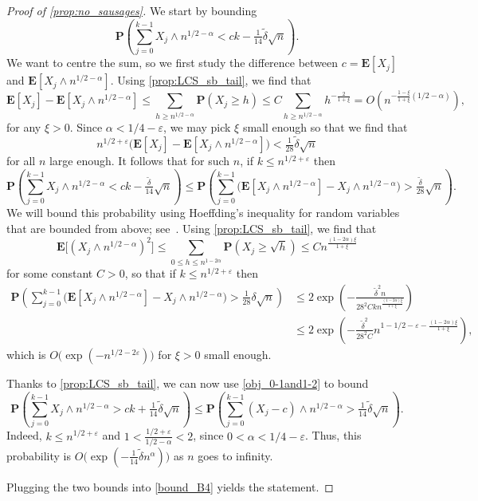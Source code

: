 \documentclass[11pt,reqno]{amsart}
\newcommand{\1}{\mathbf{1}}
\newcommand{\0}{\mathbf{0}}
\newcommand{\E}{{\mathbf E}}
\newcommand{\prob}{\mathbf{P}}
\newcommand{\eps}{\varepsilon}
\begin{document}
\begin{proof}[Proof of \cref{prop:no_sausages}]
    We start by bounding 
    \[\prob\left(\sum_{j=0}^{k-1} X_j \wedge n^{1/2-\alpha}<ck-\tfrac{1}{14}\tilde\delta \sqrt{n} \right). \]
    We want to centre the sum, so we first study the difference between $c=\E[X_j]$ and $\E[X_j\wedge n^{1/2-\alpha}]$. Using \cref{prop:LCS_sb_tail}, we find that 
    \[
    \E[X_j]-\E[X_j\wedge n^{1/2-\alpha}]\le \sum_{h\ge n^{1/2-\alpha}}\prob(X_j\ge h)\le C\sum_{h\ge n^{1/2-\alpha}} h^{-\frac{2}{1+\xi}}=O(n^{-\frac{1-\xi}{1+\xi}(1/2-\alpha)} ),
    \]
    for any $\xi>0$. Since $\alpha<1/4-\varepsilon$, we may pick $\xi$ small enough so that we find that \[n^{1/2+\varepsilon}\big(\E[X_j]-\E[X_j\wedge n^{1/2-\alpha}]\big)<\tfrac{1}{28}\tilde\delta \sqrt{n}\]
    for all $n$ large enough. It follows that for such $n$, if $k \le n^{1/2+\varepsilon}$ then 
    \[\prob\left(\sum_{j=0}^{k-1} X_j \wedge n^{1/2-\alpha}<ck-\tfrac{\tilde\delta}{14} \sqrt{n} \right)\le \prob\left(\sum_{j=0}^{k-1} \big( \E[X_j \wedge n^{1/2-\alpha} ]-X_j \wedge n^{1/2-\alpha}\big)>\tfrac{\tilde\delta}{28} \sqrt{n} \right) .\]
    We will bound this probability using Hoeffding's inequality for random variables that are bounded from above; see~\cite[Corollary 2.7]{FGL_hoeffding}. Using \cref{prop:LCS_sb_tail}, we find that 
    \[\E\big[(X_j \wedge n^{1/2-\alpha})^2\big]\le \sum_{0\le h\le n^{1-2\alpha}}\prob(X_j\ge \sqrt{h} )\le C n^{\tfrac{(1-2\alpha)\xi}{1+\xi}}\]
    for some constant $C>0$, so that if $k \le n^{1/2+\varepsilon}$ then
    \begin{align*}\prob\left(\sum_{j=0}^{k-1} \big( \E[X_j \wedge n^{1/2-\alpha} ]-X_j \wedge n^{1/2-\alpha}\big)>\tfrac{1}{28}\delta \sqrt{n} \right)&\le 2 \exp\left(-\frac{\tilde\delta^2 n }{28^2 C k n^{\tfrac{(1-2\alpha)\xi}{1+\xi}} }\right)\\&\leq 2\exp\left(-\frac{\tilde{\delta}^2}{28^2 C} n^{1-1/2-\varepsilon-\tfrac{(1-2\alpha)\xi}{1+\xi} }\right),\end{align*}
    which is $O\big(\exp(-n^{1/2-2\eps})\big)$ for $\xi>0$ small enough. 
    
    Thanks to \cref{prop:LCS_sb_tail}, we can now use \cref{obj_0-1and1-2} to bound
    \[\prob\left(\sum_{j=0}^{k-1} X_j \wedge n^{1/2-\alpha}>ck+\tfrac{1}{14}\tilde\delta \sqrt{n} \right)\le \prob\left(\sum_{j=0}^{k-1} (X_j-c) \wedge n^{1/2-\alpha}>\tfrac{1}{14}\tilde\delta \sqrt{n} \right).\]
     Indeed, $k\leq n^{1/2+\varepsilon}$ and $1<\frac{1/2+\varepsilon}{1/2-\alpha}<2$, since $0<\alpha<1/4-\varepsilon$. Thus, this probability is $O\big(\exp(-\tfrac{1}{14}\tilde\delta n^\alpha)\big)$ as $n$ goes to infinity.
     
     Plugging the two bounds into \eqref{bound_B4} yields the statement.
   \end{proof}
\end{document}
